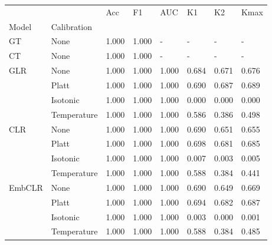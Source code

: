 \begin{tabular}{llllllll}
\toprule
 &  & Acc & F1 & AUC & K1 & K2 & Kmax \\
Model & Calibration &  &  &  &  &  &  \\
\midrule
GT & None & 1.000 & 1.000 & - & - & - & - \\
\cline{1-8}
CT & None & 1.000 & 1.000 & - & - & - & - \\
\cline{1-8}
\multirow[t]{4}{*}{GLR} & None & 1.000 & 1.000 & 1.000 & 0.684 & 0.671 & 0.676 \\
 & Platt & 1.000 & 1.000 & 1.000 & 0.690 & 0.687 & 0.689 \\
 & Isotonic & 1.000 & 1.000 & 1.000 & 0.000 & 0.000 & 0.000 \\
 & Temperature & 1.000 & 1.000 & 1.000 & 0.586 & 0.386 & 0.498 \\
\cline{1-8}
\multirow[t]{4}{*}{CLR} & None & 1.000 & 1.000 & 1.000 & 0.690 & 0.651 & 0.655 \\
 & Platt & 1.000 & 1.000 & 1.000 & 0.698 & 0.681 & 0.685 \\
 & Isotonic & 1.000 & 1.000 & 1.000 & 0.007 & 0.003 & 0.005 \\
 & Temperature & 1.000 & 1.000 & 1.000 & 0.588 & 0.384 & 0.441 \\
\cline{1-8}
\multirow[t]{4}{*}{EmbCLR} & None & 1.000 & 1.000 & 1.000 & 0.690 & 0.649 & 0.669 \\
 & Platt & 1.000 & 1.000 & 1.000 & 0.694 & 0.682 & 0.687 \\
 & Isotonic & 1.000 & 1.000 & 1.000 & 0.003 & 0.000 & 0.001 \\
 & Temperature & 1.000 & 1.000 & 1.000 & 0.588 & 0.384 & 0.485 \\
\cline{1-8}
\bottomrule
\end{tabular}
